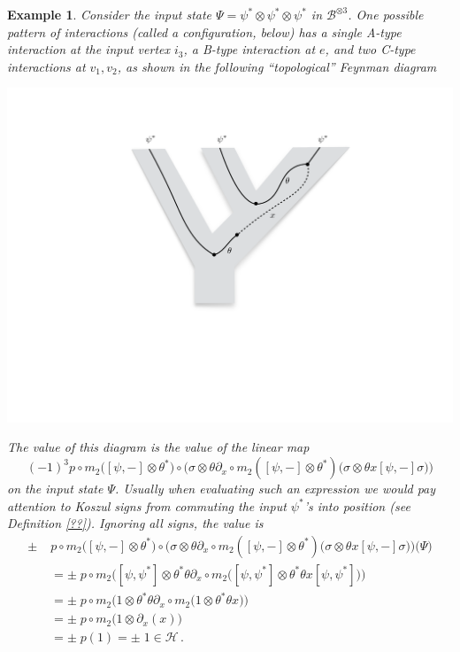 \documentclass[english,letter paper,12pt,leqno]{article}
\theoremstyle{example}
\newtheorem{example}[theorem]{Example}
\numberwithin{equation}{section}
\def\be{\begin{equation}}
\def\ee{\end{equation}}
\begin{document}
\begin{example}
Consider the input state $\Psi = \psi^* \otimes \psi^* \otimes \psi^*$ in $\mathscr{B}^{\otimes 3}$. One possible pattern of interactions (called a configuration, below) has a single A-type interaction at the input vertex $i_3$, a B-type interaction at $e$, and two C-type interactions at $v_1,v_2$, as shown in the following ``topological'' Feynman diagram
\begin{center}
\includegraphics[scale=0.3]{dia6}
\end{center}
The \emph{value} of this diagram is the value of the linear map
\be\label{eq:operator_tree_example}
(-1)^3 p \circ m_2 \big([\psi, -] \otimes \theta^*\big) \circ \big( \sigma \otimes \theta \partial_x \circ m_2 ([\psi, -] \otimes \theta^*)\big( \sigma \otimes \theta x [\psi, -] \sigma \big)\big)
\ee
on the input state $\Psi$. Usually when evaluating such an expression we would pay attention to Koszul signs from commuting the input $\psi^*$'s into position (see Definition \ref{??}). Ignoring all signs, the value is
\begin{align*}
\pm \; & p \circ m_2 \big([\psi, -] \otimes \theta^*\big) \circ \big( \sigma \otimes \theta \partial_x \circ m_2 ([\psi, -] \otimes \theta^*)\big( \sigma \otimes \theta x [\psi, -] \sigma \big)\big)\Big( \Psi \Big)\\
&= \pm \; p \circ m_2 \big([\psi, \psi^*] \otimes \theta^* \theta \partial_x \circ m_2 ([\psi, \psi^*] \otimes \theta^* \theta x [\psi, \psi^*] \big)\big)\\
&= \pm \; p \circ m_2 \big(1 \otimes \theta^* \theta \partial_x \circ m_2 (1 \otimes \theta^* \theta x \big)\big)\\
&= \pm \; p \circ m_2 \big(1 \otimes \partial_x(x) \big)\\
&= \pm \; p(1) = \pm \; 1 \in \mathscr{H}\,.
\end{align*}
\end{example}
\end{document}
